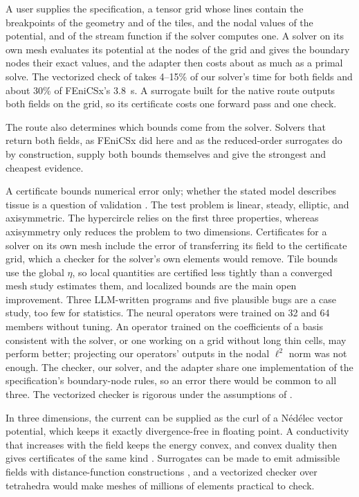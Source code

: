 \documentclass[11pt]{article}
\begin{document}
A user supplies the specification, a tensor grid whose lines contain the breakpoints
of the geometry and of the tiles, and the nodal values of the potential, and
of the stream function if the solver computes one. A solver on its own
mesh evaluates its potential at the nodes of the grid and gives the boundary nodes
their exact values, and the adapter then costs about as much as a primal solve. The
vectorized check of \cite{dovelos2026} takes 4--15\% of our solver's time for both
fields and about 30\% of FEniCSx's \SI{3.8}{s}. A surrogate built for the native route outputs both
fields on the grid, so its certificate costs one forward pass and one check.

The route also determines which bounds come from the solver. Solvers that return
both fields, as FEniCSx did here and as the reduced-order surrogates do by
construction, supply both bounds themselves and give the strongest and cheapest
evidence.

A certificate bounds numerical error only; whether the stated model describes
tissue is a question of validation \cite{dovelos2026}. The test problem is linear,
steady, elliptic, and axisymmetric. The hypercircle relies on the first three
properties, whereas axisymmetry only reduces the problem to two dimensions.
Certificates for a solver on its own mesh include the error of transferring its field
to the certificate grid, which a checker for the solver's own elements would remove.
Tile bounds use the global $\eta$, so local quantities are certified less tightly
than a converged mesh study estimates them, and localized bounds are the main open
improvement. Three LLM-written programs and five plausible bugs are a case study, too
few for statistics. The neural operators were trained on 32 and 64 members
without tuning. An operator trained on the coefficients of a basis consistent with
the solver, or one working on a grid without long thin cells, may perform better;
projecting our operators' outputs in the nodal $\ell^2$ norm was not enough. The checker, our solver, and the adapter share one implementation of the
specification's boundary-node rules, so an error there would be common to all
three. The vectorized checker is rigorous under the assumptions of \cite{dovelos2026}.

In three dimensions, the current
can be supplied as the curl of a N\'ed\'elec vector potential, which keeps it
exactly divergence-free in floating point. A conductivity that increases with the field keeps the energy convex,
and convex duality then gives certificates of the same kind \cite{repin2008}.
Surrogates can be made to emit admissible fields with distance-function
constructions \cite{sukumar2022}, and a vectorized checker over tetrahedra would make
meshes of millions of elements practical to check.
\end{document}
